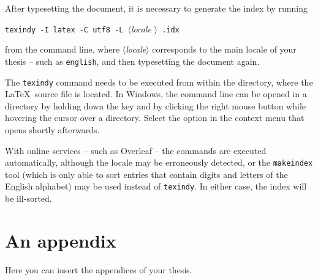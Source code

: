 \documentclass[
  digital, %
  table,   %
  lof,     %
  lot,     %
]{fithesis3}
\begin{document}
After typesetting the document, it is necessary to generate the
index by running
\begin{center}%
  \texttt{texindy -I latex -C utf8 -L }$\langle$\textit{locale}%
  $\rangle$\texttt{ \jobname.idx}
\end{center}
from the command line, where $\langle$\textit{locale}$\rangle$
corresponds to the main locale of your thesis -- such as
\texttt{english}, and then typesetting the document again.

The \texttt{texindy} command needs to be executed from within the
directory, where the \LaTeX\ source file is located. In Windows,
the command line can be opened in a directory by holding down the
 key and by clicking the right mouse button while
hovering the cursor over a directory. Select the  option in the context menu that opens shortly
afterwards.

With online services -- such as Overleaf -- the commands are
executed automatically, although the locale may be erroneously
detected, or the \texttt{makeindex} tool (which is only able to
sort entries that contain digits and letters of the English
alphabet) may be used instead of \texttt{texindy}. In either case,
the index will be ill-sorted.

\makeatletter\thesis@blocks@clear\makeatother
{} %
\printindex

\appendix %
\chapter{An appendix}
Here you can insert the appendices of your thesis.
\end{document}
